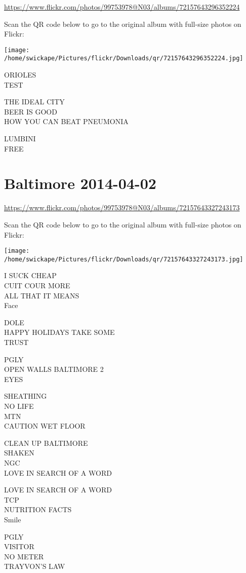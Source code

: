 \documentclass[10pt,letterpaper]{article}
\begin{document}
\url{https://www.flickr.com/photos/99753978@N03/albums/72157643296352224}

Scan the QR code below to go to the original album with full-size photos on Flickr:

\texttt{[image: /home/swickape/Pictures/flickr/Downloads/qr/72157643296352224.jpg]}


ORIOLES\\
TEST

THE IDEAL CITY\\
BEER IS GOOD\\
HOW YOU CAN BEAT PNEUMONIA

LUMBINI\\
FREE


\section*{Baltimore 2014-04-02}

\url{https://www.flickr.com/photos/99753978@N03/albums/72157643327243173}

Scan the QR code below to go to the original album with full-size photos on Flickr:

\texttt{[image: /home/swickape/Pictures/flickr/Downloads/qr/72157643327243173.jpg]}


I SUCK CHEAP\\
CUIT COUR MORE\\
ALL THAT IT MEANS\\
Face

DOLE\\
HAPPY HOLIDAYS TAKE SOME\\
TRUST

PGLY\\
OPEN WALLS BALTIMORE 2\\
EYES

SHEATHING\\
NO LIFE\\
MTN\\
CAUTION WET FLOOR

CLEAN UP BALTIMORE\\
SHAKEN\\
NGC\\
LOVE IN SEARCH OF A WORD

LOVE IN SEARCH OF A WORD\\
TCP\\
NUTRITION FACTS\\
Smile

PGLY\\
VISITOR\\
NO METER\\
TRAYVON'S LAW
\end{document}
